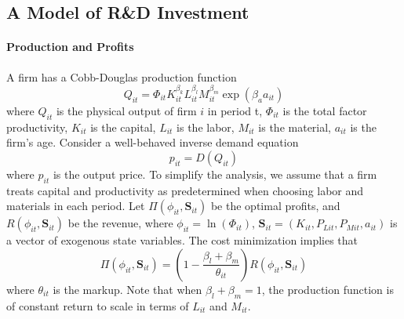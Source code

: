 \documentclass[11pt]{article}
\begin{document}
\subsection{A Model of R\&D Investment}

\paragraph{Production and Profits} A firm has a Cobb-Douglas production function
\begin{equation}
Q_{it} = \Phi_{it}K_{it}^{\beta_{k}}L_{it}^{\beta_l}M_{it}^{\beta_m}\exp{(\beta_a a_{it})}
\end{equation}
where $Q_{it}$ is the physical output of firm $i$ in period t, $\Phi_{it}$ is the total factor productivity, $K_{it}$ is the capital, $L_{it}$ is the labor, $M_{it}$ is the material, $a_{it}$ is the firm's age. Consider a well-behaved inverse demand equation
\begin{equation}
    p_{it} = D(Q_{it})
\end{equation}
where $p_{it}$ is the output price. To simplify the analysis, we assume that a firm treats capital and productivity as predetermined when choosing labor and materials in each period. Let $\Pi(\phi_{it},\mathbf{S}_{it})$ be the optimal profits, and $R(\phi_{it},\mathbf{S}_{it})$ be the revenue, where $\phi_{it}=\ln(\Phi_{it})$, $\mathbf{S}_{it}=(K_{it}, P_{Lit}, P_{Mit}, a_{it})$ is a vector of exogenous state variables. The cost minimization implies that
\begin{equation}
    \Pi(\phi_{it},\mathbf{S}_{it}) = (1-\frac{\beta_l+\beta_m}{\theta_{it}})R(\phi_{it},\mathbf{S}_{it})
\end{equation}
where $\theta_{it}$ is the markup. Note that when $\beta_l+\beta_m=1$, the production function is of constant return to scale in terms of $L_{it}$ and $M_{it}$.
\end{document}
